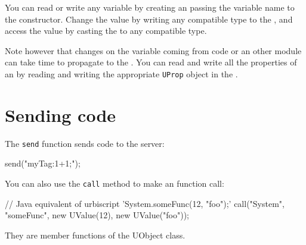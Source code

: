 You can read or write any \urbi variable by creating an \UVar passing the
variable name to the constructor. Change the value by writing any compatible
type to the \UVar, and access the value by casting the \UVar to any
compatible type.

Note however that changes on the variable coming from \urbi code or an other
module can take time to propagate to the \UVar.  You can read and write all
the \urbi properties of an \UVar by reading and writing the appropriate
\lstinline{UProp} object in the \UVar.

\section{Sending \urbi code}
\label{sec:uob:apijava:sendcode}

The \lstinline{send} function sends \urbi code to the server:

\begin{java}
send("myTag:1+1;");
\end{java}

\noindent
{}%
You can also use the \lstinline{call} method to make an \us function call:

\begin{java}
// Java equivalent of urbiscript 'System.someFunc(12, "foo");'
call("System", "someFunc", new UValue(12), new UValue("foo"));
\end{java}

They are member functions of the UObject class.


